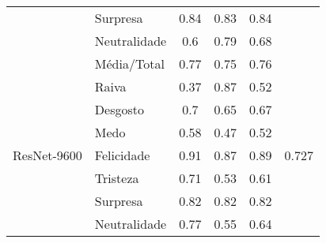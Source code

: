 \begin{table}[]
\begin{tabular}{llcccc}
                                         & Surpresa              & 0.84                                  & 0.83                                   & 0.84                                  &                                       \\
                                         & Neutralidade          & 0.6                                   & 0.79                                   & 0.68                                  &                                       \\
                                         & Média/Total           & 0.77                                  & 0.75                                   & 0.76                                  &                                       \\ \hline
\multirow{8}{*}{ResNet-9600}           & Raiva                 & 0.37                                  & 0.87                                   & 0.52                                  & \multirow{8}{*}{0.727}                \\
                                         & Desgosto              & 0.7                                   & 0.65                                   & 0.67                                  &                                       \\
                                         & Medo                  & 0.58                                  & 0.47                                   & 0.52                                  &                                       \\
                                         & Felicidade            & 0.91                                  & 0.87                                   & 0.89                                  &                                       \\
                                         & Tristeza              & 0.71                                  & 0.53                                   & 0.61                                  &                                       \\
                                         & Surpresa              & 0.82                                  & 0.82                                   & 0.82                                  &                                       \\
                                         & Neutralidade          & 0.77                                  & 0.55                                   & 0.64                                  &                                       \\

\end{tabular}
\end{table}
